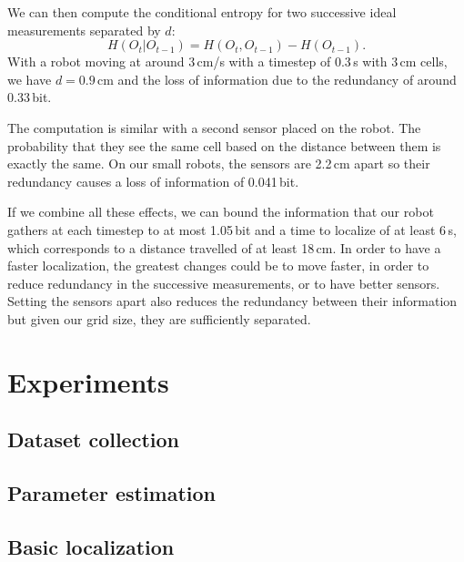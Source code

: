 \documentclass[letterpaper, 10pt, conference]{ieeeconf}
\begin{document}
We can then compute the conditional entropy for two successive ideal measurements separated by $d$:
\begin{displaymath}
	H(O_t | O_{t-1}) = H(O_t, O_{t-1}) - H(O_{t-1}).
\end{displaymath}
With a robot moving at around 3\,cm/s with a timestep of 0.3\,s with 3\,cm cells, we have $d=0.9$\,cm and the loss of information due to the redundancy of around 0.33\,bit.

The computation is similar with a second sensor placed on the robot.
The probability that they see the same cell based on the distance between them is exactly the same.
On our small robots, the sensors are 2.2\,cm apart so their redundancy causes a loss of information of 0.041\,bit.

If we combine all these effects, we can bound the information that our robot gathers at each timestep to at most 1.05\,bit and a time to localize of at least 6\,s, which corresponds to a distance travelled of at least 18\,cm.
In order to have a faster localization, the greatest changes could be to move faster, in order to reduce redundancy in the successive measurements, or to have better sensors.
Setting the sensors apart also reduces the redundancy between their information but given our grid size, they are sufficiently separated.

\section{Experiments}

\subsection{Dataset collection}


\subsection{Parameter estimation}
\label{sec:mle}


\subsection{Basic localization}
\end{document}
